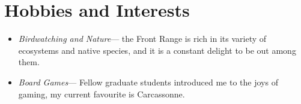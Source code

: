 \documentclass[12pt, a4paper]{scrartcl}
\begin{document}
 \section*{Hobbies and Interests}          
 \begin{itemize}
     \item \textit{Birdwatching and Nature}--- the Front Range is rich in its
         variety of ecosystems and native species, and it is a constant delight
         to be out among them.
     \item \textit{Board Games}--- Fellow graduate students introduced me
         to the joys of gaming, my current favourite is Carcassonne.
 \end{itemize}
 
% 
% 
\end{document}
